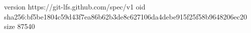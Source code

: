 version https://git-lfs.github.com/spec/v1
oid sha256:bf5be1804c59d43f7ea86b62b3de8c627106da4debe915f25f58b9648206ec20
size 87540
